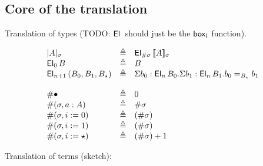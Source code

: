 \documentclass{article}
\newcommand{\defeq}{\triangleq}
\begin{document}
\subsection{Core of the translation}

Translation of types (TODO: $\mathsf{El}_{}\,$ should just be the $\mathsf{box}_{l}$ function).

$$
\begin{array}{lcll}
\semtypenew{\sigma}{A} & \defeq & \elt{\#\sigma}{\semnew{\sigma}{A}}\\
\elt{0}{B} & \defeq & B\\
\elt{n+1}{(B_0,B_1,B_\star)} & \defeq &
  \Sigma b_0:\elt{n}{B_0}.
  \Sigma b_1:\elt{n}{B_1}.
  b_0 =_{B_\star} b_1\\
\\
\# \emptysigma & \defeq & 0\\
\# (\sigma,a:A) & \defeq & \#\sigma\\
\# (\sigma,i:=0) & \defeq & (\#\sigma)\\
\# (\sigma,i:=1) & \defeq & (\#\sigma)\\
\# (\sigma,i:=\star) & \defeq & (\#\sigma) + 1\\
\end{array}
$$

\noindent Translation of terms (sketch):
\end{document}
